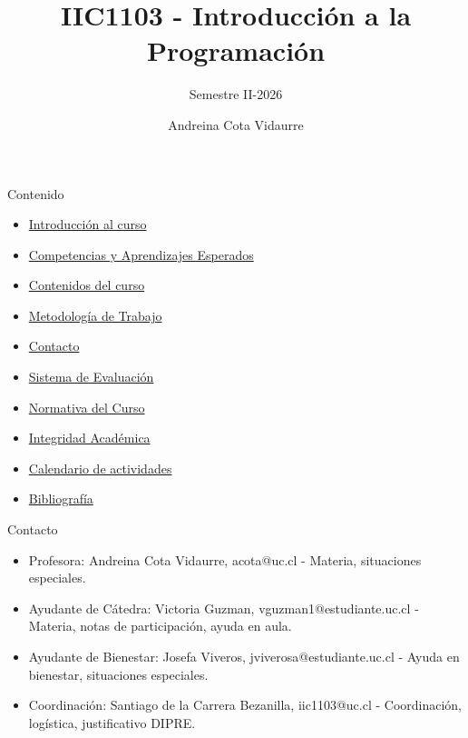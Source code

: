 \documentclass{beamer}
\title{IIC1103 - Introducción a la Programación} %
\subtitle{Semestre II-2026} %
\author{Andreina Cota Vidaurre}
\begin{document}
  \shorthandoff{-}
  \frame[c]{\maketitle}


    \begin{frame}{Contenido}
        \begin{itemize}
            \item \hyperlink{introduccion}{Introducción al curso}
            \item \hyperlink{competencias}{Competencias y Aprendizajes Esperados}
            \item \hyperlink{contenidos}{Contenidos del curso}
            \item \hyperlink{metodologia}{Metodología de Trabajo}
            \item \hyperlink{contacto}{Contacto}
            \item \hyperlink{evaluacion}{Sistema de Evaluación}
            \item \hyperlink{normativa}{Normativa del Curso}
            \item \hyperlink{integridad-academica}{Integridad Académica}
            \item \hyperlink{calendario}{Calendario de actividades}
            \item \hyperlink{bibliografia}{Bibliografía}
        \end{itemize}
    \end{frame}

    \begin{frame}{Contacto}
        \begin{itemize}
            \item Profesora: Andreina Cota Vidaurre, acota@uc.cl - Materia, situaciones especiales.
            \item Ayudante de Cátedra: Victoria Guzman, vguzman1@estudiante.uc.cl - Materia, notas de participación, ayuda en aula.
            \item Ayudante de Bienestar: Josefa Viveros, jviverosa@estudiante.uc.cl - Ayuda en bienestar, situaciones especiales.
            \item Coordinación: Santiago de la Carrera Bezanilla, iic1103@uc.cl - Coordinación, logística, justificativo DIPRE.
        \end{itemize}
    \end{frame}
\end{document}
